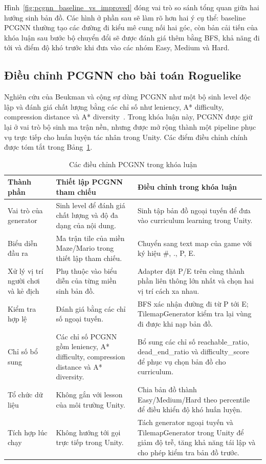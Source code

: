 Hình~\ref{fig:pcgnn_baseline_vs_improved} đóng vai trò so sánh tổng quan giữa hai hướng sinh bản đồ. Các hình ở phần sau sẽ làm rõ hơn hai ý cụ thể: baseline PCGNN thường tạo các đường đi kiểu mê cung nối hai góc, còn bản cải tiến của khóa luận sau bước bộ chuyển đổi sẽ được đánh giá thêm bằng BFS, khả năng đi tới và điểm độ khó trước khi đưa vào các nhóm Easy, Medium và Hard.

\subsection{Điều chỉnh PCGNN cho bài toán Roguelike}

Nghiên cứu của Beukman và cộng sự dùng PCGNN như một bộ sinh level độc lập và đánh giá chất lượng bằng các chỉ số như leniency, A* difficulty, compression distance và A* diversity~\cite{Beukman2022}. Trong khóa luận này, PCGNN được giữ lại ở vai trò bộ sinh ma trận nền, nhưng được mở rộng thành một pipeline phục vụ trực tiếp cho huấn luyện tác nhân trong Unity. Các điểm điều chỉnh chính được tóm tắt trong Bảng~\ref{tab:pcgnn_improvements}.

\begin{table}[H]
    \centering
    \small
    \caption{Các điều chỉnh PCGNN trong khóa luận}
    \label{tab:pcgnn_improvements}
    \begin{tabular}{p{4.0cm} p{5.0cm} p{5.0cm}}
        \toprule
        \textbf{Thành phần} & \textbf{Thiết lập PCGNN tham chiếu} & \textbf{Điều chỉnh trong khóa luận} \\
        \midrule
        Vai trò của generator & Sinh level để đánh giá chất lượng và độ đa dạng của nội dung. & Sinh tập bản đồ ngoại tuyến để đưa vào curriculum learning trong Unity. \\
        Biểu diễn đầu ra & Ma trận tile của miền Maze/Mario trong thiết lập tham chiếu. & Chuyển sang text map của game với ký hiệu \#, ., P, E. \\
        Xử lý vị trí người chơi và kẻ địch & Phụ thuộc vào biểu diễn của từng miền sinh bản đồ. & Adapter đặt P/E trên cùng thành phần liên thông lớn nhất và chọn hai vị trí cách xa nhau. \\
        Kiểm tra hợp lệ & Đánh giá bằng các chỉ số ngoại tuyến. & BFS xác nhận đường đi từ P tới E; TilemapGenerator kiểm tra lại vùng đi được khi nạp bản đồ. \\
        Chỉ số bổ sung & Các chỉ số PCGNN gồm leniency, A* difficulty, compression distance và A* diversity. & Bổ sung các chỉ số reachable\_ratio, dead\_end\_ratio và difficulty\_score để phục vụ chọn bản đồ cho curriculum. \\
        Tổ chức dữ liệu & Không gắn với lesson của môi trường Unity. & Chia bản đồ thành Easy/Medium/Hard theo percentile để điều khiển độ khó huấn luyện. \\
        Tích hợp lúc chạy & Không hướng tới gọi trực tiếp trong Unity. & Tách generator ngoại tuyến và TilemapGenerator trong Unity để giảm độ trễ, tăng khả năng tái lập và cho phép kiểm tra bản đồ trước. \\
        \bottomrule
    \end{tabular}
\end{table}

